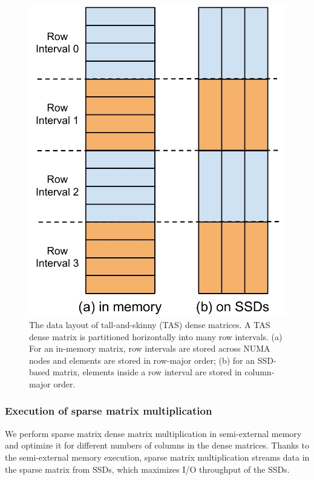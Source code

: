 \begin{figure}
\centering
\includegraphics[scale=0.4]{./dense_matrix.pdf}
\vspace{-5pt}
\caption{The data layout of tall-and-skinny (TAS) dense matrices. A TAS
dense matrix is partitioned horizontally into many row intervals.
(a) For an in-memory matrix, row intervals are stored across NUMA nodes and
elements are stored in row-major order; (b) for an SSD-based matrix, elements
inside a row interval are stored in column-major order.}
\vspace{-5pt}
\label{dense_mat}
\end{figure}

\subsubsection{Execution of sparse matrix multiplication} \label{sec:exec}
We perform sparse matrix dense matrix multiplication in semi-external memory
and optimize it for different numbers of columns in the dense matrices.
Thanks to the semi-external memory execution, sparse matrix multiplication
streams data in the sparse matrix from SSDs, which maximizes I/O throughput
of the SSDs.


